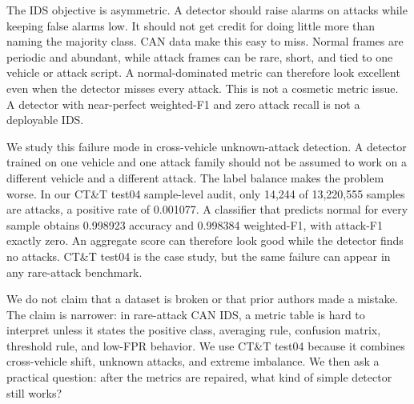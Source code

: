 \documentclass[runningheads]{llncs}%
\begin{document}
The IDS objective is asymmetric.  A detector should raise alarms on attacks while keeping false alarms low.  It should not get credit for doing little more than naming the majority class.  CAN data make this easy to miss.  Normal frames are periodic and abundant, while attack frames can be rare, short, and tied to one vehicle or attack script.  A normal-dominated metric can therefore look excellent even when the detector misses every attack.  This is not a cosmetic metric issue.  A detector with near-perfect weighted-F1 and zero attack recall is not a deployable IDS.

We study this failure mode in cross-vehicle unknown-attack detection.  A detector trained on one vehicle and one attack family should not be assumed to work on a different vehicle and a different attack.  The label balance makes the problem worse.  In our CT\&T test04 sample-level audit, only 14,244 of 13,220,555 samples are attacks, a positive rate of 0.001077.  A classifier that predicts normal for every sample obtains 0.998923 accuracy and 0.998384 weighted-F1, with attack-F1 exactly zero.  An aggregate score can therefore look good while the detector finds no attacks.  CT\&T test04 is the case study, but the same failure can appear in any rare-attack benchmark.

We do not claim that a dataset is broken or that prior authors made a mistake.  The claim is narrower: in rare-attack CAN IDS, a metric table is hard to interpret unless it states the positive class, averaging rule, confusion matrix, threshold rule, and low-FPR behavior.  We use CT\&T test04 because it combines cross-vehicle shift, unknown attacks, and extreme imbalance.  We then ask a practical question: after the metrics are repaired, what kind of simple detector still works?
\end{document}
